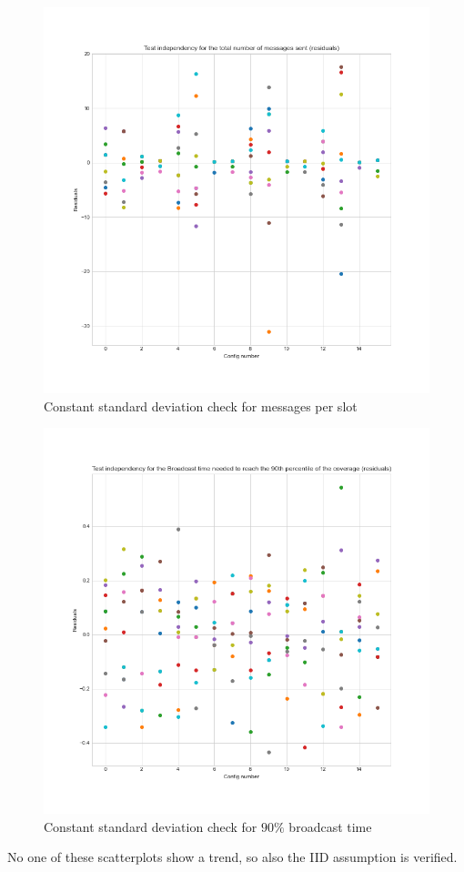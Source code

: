 \begin{figure}
	\centering
	\includegraphics[width=\textwidth]
	{img/lowdensity2kr/assumptions/msgsPerSlot-independency.png}
	\caption{Constant standard deviation check for messages per
	slot}\label{fig:system}
\end{figure}

\begin{figure}
	\centering
	\includegraphics[width=\textwidth]
	{img/lowdensity2kr/assumptions/broadcastTime90-independency.png}
	\caption{Constant standard deviation check for \(90\%\) broadcast
	time}\label{fig:system}
\end{figure}

No one of these scatterplots show a trend, so also the IID assumption is
verified.
